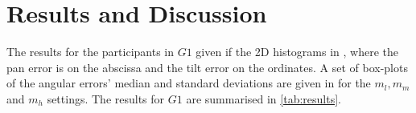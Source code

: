 \documentclass[sigconf, screen=true, anonymous=true]{acmart}
\begin{document}




\section{Results and Discussion}\label{sec:results}

The results for the participants in $G1$ given if the 2D histograms in , where the pan error is on the abscissa and the tilt error on the ordinates.
A set of box-plots of the angular errors' median and standard deviations are given in  for the $m_l, m_m$ and $m_h$ settings. 
The results for $G1$ are summarised in \cref{tab:results}.
\end{document}
